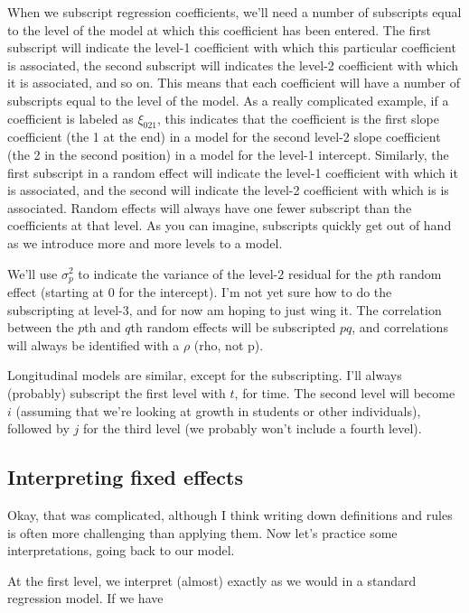 \documentclass[
  letterpaper,
  DIV=11,
  numbers=noendperiod]{scrreprt}
\begin{document}
When we subscript regression coefficients, we'll need a number of
subscripts equal to the level of the model at which this coefficient has
been entered. The first subscript will indicate the level-1 coefficient
with which this particular coefficient is associated, the second
subscript will indicates the level-2 coefficient with which it is
associated, and so on. This means that each coefficient will have a
number of subscripts equal to the level of the model. As a really
complicated example, if a coefficient is labeled as \(\xi_{021}\), this
indicates that the coefficient is the first slope coefficient (the 1 at
the end) in a model for the second level-2 slope coefficient (the 2 in
the second position) in a model for the level-1 intercept. Similarly,
the first subscript in a random effect will indicate the level-1
coefficient with which it is associated, and the second will indicate
the level-2 coefficient with which is is associated. Random effects will
always have one fewer subscript than the coefficients at that level. As
you can imagine, subscripts quickly get out of hand as we introduce more
and more levels to a model.

We'll use \(\sigma^2_p\) to indicate the variance of the level-2
residual for the \(p\)th random effect (starting at 0 for the
intercept). I'm not yet sure how to do the subscripting at level-3, and
for now am hoping to just wing it. The correlation between the \(p\)th
and \(q\)th random effects will be subscripted \(pq\), and correlations
will always be identified with a \(\rho\) (rho, not p).

Longitudinal models are similar, except for the subscripting. I'll
always (probably) subscript the first level with \(t\), for time. The
second level will become \(i\) (assuming that we're looking at growth in
students or other individuals), followed by \(j\) for the third level
(we probably won't include a fourth level).

\subsection*{Interpreting fixed
effects}\label{interpreting-fixed-effects}

Okay, that was complicated, although I think writing down definitions
and rules is often more challenging than applying them. Now let's
practice some interpretations, going back to our model.

At the first level, we interpret (almost) exactly as we would in a
standard regression model. If we have
\end{document}
